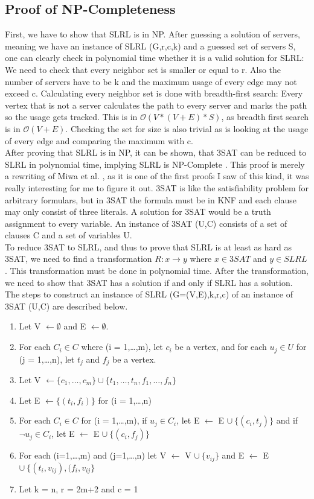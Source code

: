 \documentclass [12pt]{article}
\begin{document}
\subsection{Proof of NP-Completeness}
First, we have to show that SLRL is in NP. After guessing a solution of servers, meaning we 
have an instance of SLRL (G,r,c,k) and a guessed set of servers S, one can clearly check 
in polynomial time whether it is a valid solution for SLRL: We need to check that every neighbor set is smaller
or equal to r. Also the number of servers have to be k and the maximum usage of every edge may not exceed c.
Calculating every neighbor set is done with breadth-first search: Every vertex that is not a server calculates
the path to every server and marks the path so the usage gets tracked. This is in $\mathcal{O}(V*(V+E)*S)$, as breadth first
search is in $\mathcal{O}(V+E)$. Checking the set for size is also trivial as is looking at the usage of
every edge and comparing the maximum with c.\\
After proving that SLRL is in NP, it can be shown, that 3SAT can be reduced to SLRL in polynomial time,
implying SLRL is NP-Complete \cite{Garey:1979:CIG:578533}.
This proof is merely a rewriting of Miwa et al. \cite{mirrorserver}, as it is one of the first proofs I saw of 
this kind, it was really interesting for me to figure it out.
3SAT is like the satisfiability problem for arbitrary formulars, but in 3SAT the formula must be in KNF and 
each clause may only consist of three literals. A solution for 3SAT would be a truth assignment to every
variable. An instance of 3SAT (U,C) consists of a set of clauses C and a set of variables U.\\
To reduce 3SAT to SLRL, and thus to prove that SLRL is at least as hard as 3SAT, we need to find a 
transformation $R: x \rightarrow y$ where $x \in 3SAT$ and $y \in SLRL$. This transformation must be 
done in polynomial time. After the transformation, we need to show that 3SAT has a solution if and only if 
SLRL has a solution.\\
The steps to construct an instance of SLRL (G=(V,E),k,r,c) of an instance of 3SAT (U,C) are described below.
\begin{enumerate}
  \item{Let V $\leftarrow \emptyset$ and E $\leftarrow \emptyset$.}
  \item{For each $C_i \in C$ where (i = 1,\dots,m), let $c_i$ be a vertex, and for each $u_j \in U$ for (j = 1,\dots,n),
    let $t_j$ and $f_j$ be a vertex.}
  \item {Let V $\leftarrow \{c_1, \dots, c_m\} \cup \{t_1, \dots, t_n, f_1, \dots, f_n\} $ }
  \item {Let E $\leftarrow \{(t_i,f_i)\}$ for (i = 1,\dots,n) }
  \item {For each $C_i \in C$ for (i = 1,\dots,m), if $u_j \in C_i$, let E $\leftarrow$ E $\cup \ \{ (c_i ,t_j) \}$
    and if $\neg u_j \in C_i$, let E $\leftarrow$ E $\cup \ \{(c_i,f_j)\}$ }
  \item{For each (i=1,\dots,m) and (j=1,\dots,n) let V $\leftarrow$  V $\cup \ \{v_{ij}\}$ and E $\leftarrow$ E $\cup \ \{(t_i,v_{ij}), (f_i, v_{ij} \}$ }
  \item{Let k = n, r = 2m+2 and c = 1}
\end{enumerate}
\end{document}
